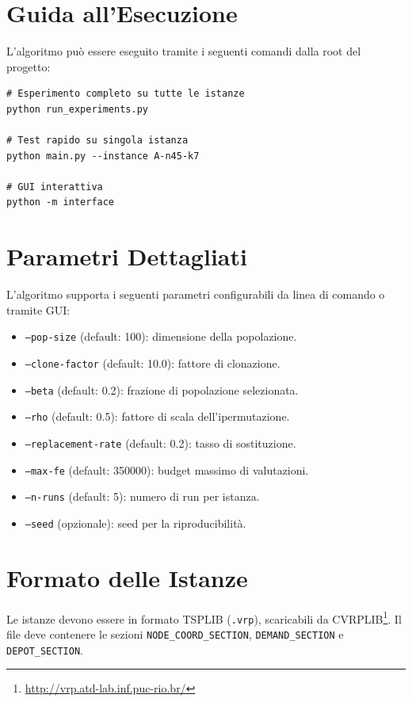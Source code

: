 \documentclass[a4paper,12pt]{article}
\begin{document}
\begin{appendices}

\section{Guida all'Esecuzione}

L'algoritmo può essere eseguito tramite i seguenti comandi dalla root del progetto:

\begin{verbatim}
# Esperimento completo su tutte le istanze
python run_experiments.py

# Test rapido su singola istanza
python main.py --instance A-n45-k7

# GUI interattiva
python -m interface
\end{verbatim}

\section{Parametri Dettagliati}

L'algoritmo supporta i seguenti parametri configurabili da linea di comando o tramite GUI:

\begin{itemize}[leftmargin=*]
    \item \texttt{--pop-size} (default: 100): dimensione della popolazione.
    \item \texttt{--clone-factor} (default: 10.0): fattore di clonazione.
    \item \texttt{--beta} (default: 0.2): frazione di popolazione selezionata.
    \item \texttt{--rho} (default: 0.5): fattore di scala dell'ipermutazione.
    \item \texttt{--replacement-rate} (default: 0.2): tasso di sostituzione.
    \item \texttt{--max-fe} (default: 350000): budget massimo di valutazioni.
    \item \texttt{--n-runs} (default: 5): numero di run per istanza.
    \item \texttt{--seed} (opzionale): seed per la riproducibilità.
\end{itemize}

\section{Formato delle Istanze}

Le istanze devono essere in formato TSPLIB (\texttt{.vrp}), scaricabili da CVRPLIB\footnote{\url{http://vrp.atd-lab.inf.puc-rio.br/}}. Il file deve contenere le sezioni \texttt{NODE\_COORD\_SECTION}, \texttt{DEMAND\_SECTION} e \texttt{DEPOT\_SECTION}.

\end{appendices}
\end{document}
